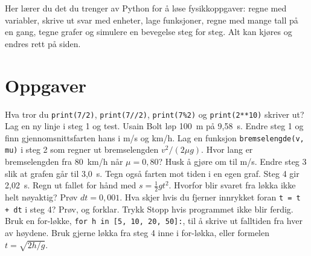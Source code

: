 \documentclass[11pt]{article}
\begin{document}

Her lærer du det du trenger av Python for å løse fysikkoppgaver: regne med variabler, skrive ut svar med enheter, lage funksjoner, regne med mange tall på en gang, tegne grafer og simulere en bevegelse steg for steg. Alt kan kjøres og endres rett på siden.

\section*{Oppgaver}

\begin{oppgaveliste}
\oppgave {}Hva tror du \texttt{print(7/2)}, \texttt{print(7//2)}, \texttt{print(7\%2)} og \texttt{print(2**10)} skriver ut? Lag en ny linje i steg 1 og test.
\svar
\oppgave {}Usain Bolt løp 100~m på 9,58~s. Endre steg 1 og finn gjennomsnittsfarten hans i m/s og km/h.
\svar
\oppgave {}Lag en funksjon \texttt{bremselengde(v, mu)} i steg 2 som regner ut bremselengden $v^{2}/(2μg)$. Hvor lang er bremselengden fra 80~km/h når $μ = 0{,}80$? Husk å gjøre om til m/s.
\svar
\oppgave {}Endre steg 3 slik at grafen går til 3,0~s. Tegn også farten mot tiden i en egen graf.
\svar
\oppgave {}Steg 4 gir 2,02~s. Regn ut fallet for hånd med $s = \tfrac{1}{2}gt^{2}$. Hvorfor blir svaret fra løkka ikke helt nøyaktig? Prøv $dt = 0{,}001$.
\svar
\oppgave {}Hva skjer hvis du fjerner innrykket foran \texttt{t = t + dt} i steg 4? Prøv, og forklar. Trykk Stopp hvis programmet ikke blir ferdig.
\svar
\oppgave {}Bruk en for-løkke, \texttt{for h in [5, 10, 20, 50]:}, til å skrive ut falltiden fra hver av høydene. Bruk gjerne løkka fra steg 4 inne i for-løkka, eller formelen $t = \sqrt{2h/g}$.
\svar
\end{oppgaveliste}
\end{document}
